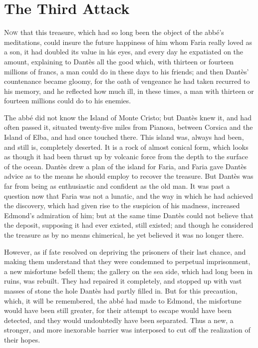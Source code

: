 \chapter{The Third Attack} 

 \lettrine{N}{ow} that this treasure, which had so long been the object of the abbé's meditations, could insure the future happiness of him whom Faria really loved as a son, it had doubled its value in his eyes, and every day he expatiated on the amount, explaining to Dantès all the good which, with thirteen or fourteen millions of francs, a man could do in these days to his friends; and then Dantès' countenance became gloomy, for the oath of vengeance he had taken recurred to his memory, and he reflected how much ill, in these times, a man with thirteen or fourteen millions could do to his enemies. 

 The abbé did not know the Island of Monte Cristo; but Dantès knew it, and had often passed it, situated twenty-five miles from Pianosa, between Corsica and the Island of Elba, and had once touched there. This island was, always had been, and still is, completely deserted. It is a rock of almost conical form, which looks as though it had been thrust up by volcanic force from the depth to the surface of the ocean. Dantès drew a plan of the island for Faria, and Faria gave Dantès advice as to the means he should employ to recover the treasure. But Dantès was far from being as enthusiastic and confident as the old man. It was past a question now that Faria was not a lunatic, and the way in which he had achieved the discovery, which had given rise to the suspicion of his madness, increased Edmond's admiration of him; but at the same time Dantès could not believe that the deposit, supposing it had ever existed, still existed; and though he considered the treasure as by no means chimerical, he yet believed it was no longer there. 

 However, as if fate resolved on depriving the prisoners of their last chance, and making them understand that they were condemned to perpetual imprisonment, a new misfortune befell them; the gallery on the sea side, which had long been in ruins, was rebuilt. They had repaired it completely, and stopped up with vast masses of stone the hole Dantès had partly filled in. But for this precaution, which, it will be remembered, the abbé had made to Edmond, the misfortune would have been still greater, for their attempt to escape would have been detected, and they would undoubtedly have been separated. Thus a new, a stronger, and more inexorable barrier was interposed to cut off the realization of their hopes. 

